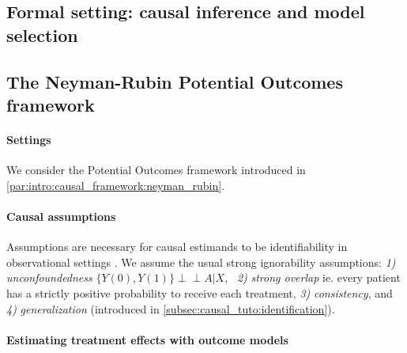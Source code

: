 \documentclass[french,12pt,twoside,a4paper]{book}
\newcommand{\indep}{\perp \!\!\! \perp}
\begin{document}
\begin{background_box_left}

  \section{Formal setting: causal inference and model selection}%
  \label{sec:causal_model_selection:setting}%

  \subsection{The Neyman-Rubin Potential Outcomes framework}%
  \label{subsec:causal_model_selection:framework}%

  \paragraph{Settings} We consider the Potential Outcomes framework introduced in
  \ref{par:intro:causal_framework:neyman_rubin}.

  \paragraph{Causal assumptions}\label{par:causal_assumptions}

  Assumptions are necessary for causal estimands to be
  identifiability
  in observational settings \citep{rubin_causal_2005}. We assume the usual
  strong ignorability assumptions: \emph{1)}
  \emph{unconfoundedness} \mbox{$\{Y(0),
      Y(1) \} \indep A | X$}, \emph{~2)} \emph{strong overlap} ie. every patient has a
  strictly positive probability to receive each treatment, \emph{3)}
  \emph{consistency}, and \emph{4)} \emph{generalization} (introduced in
  \ref{subsec:causal_tuto:identification}).

  \paragraph{Estimating treatment effects with outcome models}\label{subsec:estimators}


\end{background_box_left}
\end{document}
